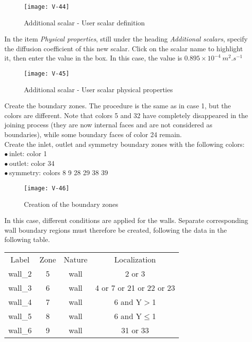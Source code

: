 \begin{figure}[h!]
\begin{center}
\texttt{[image: V-44]}
\caption{Additional scalar - User scalar definition}
\label{fig8_e2}
\end{center}
\end{figure}


\newpage
In the item {\itshape Physical properties}, still under the heading
{\itshape Additional scalars}, specify the diffusion coefficient of this new
scalar. Click on the scalar name to highlight it, then enter the value in the
box. In this case, the value is
$0.895\times 10^{-4}\ m^{2}.s^{-1}$

\begin{figure}[h!]
\begin{center}
\texttt{[image: V-45]}
\caption{Additional scalar - User scalar physical properties}
\label{fig9_e2}
\end{center}
\end{figure}


\newpage
Create the boundary zones. The procedure is the same as in case 1, but the
colors are different. Note that colors 5 and 32 have completely disappeared in
the joining process (they are now internal faces and are not considered as
boundaries), while some boundary faces of color 24 remain.\\
Create the inlet, outlet
and symmetry boundary zones with the following colors:\\
\hspace*{1cm}$\bullet\ $inlet: color 1\\
\hspace*{1cm}$\bullet\ $outlet: color 34\\
\hspace*{1cm}$\bullet\ $symmetry: colors 8 9 28 29 38 39\\

\begin{figure}[h!]
\begin{center}
\texttt{[image: V-46]}
\caption{Creation of the boundary zones}
\label{fig10_e2}
\end{center}
\end{figure}


\newpage
In this case, different conditions are applied for the walls. Separate
corresponding wall boundary regions must therefore be created, following the
data in the following table.

\begin{center}
\begin{tabular}{cccc}
Label & Zone & Nature & Localization \\
wall\_2 & 5 & wall & 2 or 3 \\
wall\_3 & 6 & wall & 4 or 7 or 21 or 22 or 23 \\
wall\_4 & 7 & wall & 6 and Y$>$1 \\
wall\_5 & 8 & wall & 6 and Y$\leqslant$1 \\
wall\_6 & 9 & wall & 31 or 33 \\
\end{tabular}
\end{center}

